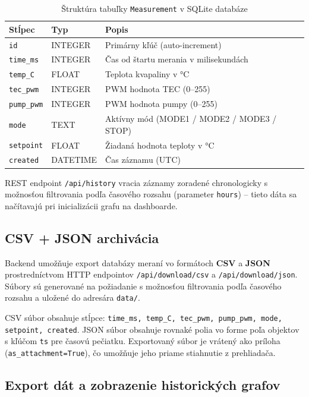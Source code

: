 \begin{table}[H]
\centering
\begin{tabular}{|l|l|l|}
\hline
\textbf{Stĺpec} & \textbf{Typ} & \textbf{Popis} \\
\hline
\texttt{id}       & INTEGER  & Primárny kľúč (auto-increment) \\
\texttt{time\_ms} & INTEGER  & Čas od štartu merania v milisekundách \\
\texttt{temp\_C}  & FLOAT    & Teplota kvapaliny v °C \\
\texttt{tec\_pwm} & INTEGER  & PWM hodnota TEC (0--255) \\
\texttt{pump\_pwm}& INTEGER  & PWM hodnota pumpy (0--255) \\
\texttt{mode}     & TEXT     & Aktívny mód (MODE1 / MODE2 / MODE3 / STOP) \\
\texttt{setpoint} & FLOAT    & Žiadaná hodnota teploty v °C \\
\texttt{created}  & DATETIME & Čas záznamu (UTC) \\
\hline
\end{tabular}
\caption{Štruktúra tabuľky \texttt{Measurement} v SQLite databáze}
\end{table}

REST endpoint \texttt{/api/history} vracia záznamy zoradené chronologicky s možnosťou
filtrovania podľa časového rozsahu (parameter \texttt{hours}) -- tieto dáta sa
načítavajú pri inicializácii grafu na dashboarde.

\subsection{CSV + JSON archivácia}

Backend umožňuje export databázy meraní vo formátoch \textbf{CSV} a \textbf{JSON}
prostredníctvom HTTP endpointov \texttt{/api/download/csv} a \texttt{/api/download/json}.
Súbory sú generované na požiadanie s možnosťou filtrovania podľa časového rozsahu
a uložené do adresára \texttt{data/}.

CSV súbor obsahuje stĺpce: \texttt{time\_ms, temp\_C, tec\_pwm, pump\_pwm, mode, setpoint, created}.
JSON súbor obsahuje rovnaké polia vo forme poľa objektov s kľúčom \texttt{ts} pre
časovú pečiatku. Exportovaný súbor je vrátený ako príloha (\texttt{as\_attachment=True}),
čo umožňuje jeho priame stiahnutie z prehliadača.

\subsection{Export dát a zobrazenie historických grafov}

